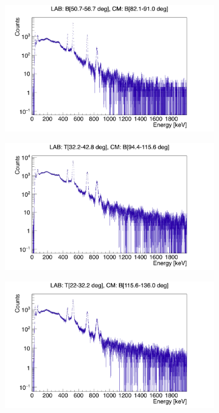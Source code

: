 \documentclass[twoside,english]{uiofysmaster/uiofysmaster}
\begin{document}
\begin{figure}[htb!]
\begin{subfigure}[t]{0.49\textwidth}
		\caption{}
	\end{subfigure}
	\hfill
	\begin{subfigure}[t]{0.49\textwidth}
		\centering
		\includegraphics[width=\textwidth]{../Plots/plotting/Projections-combined/B_dcB_x-ProjY_13-16_combined}
		\caption{}
	\end{subfigure}
	\begin{subfigure}[t]{0.49\textwidth}
		\centering
		\includegraphics[width=\textwidth]{../Plots/plotting/Projections-combined/T_dcB_x-ProjY_5-8_combined.png}
		\caption{}
	\end{subfigure}
	\hfill
	\begin{subfigure}[t]{0.49\textwidth}
		\centering
		\includegraphics[width=\textwidth]{../Plots/plotting/Projections-combined/T_dcB_x-ProjY_2-4_combined.png}

\end{subfigure}
\end{figure}
\end{document}
